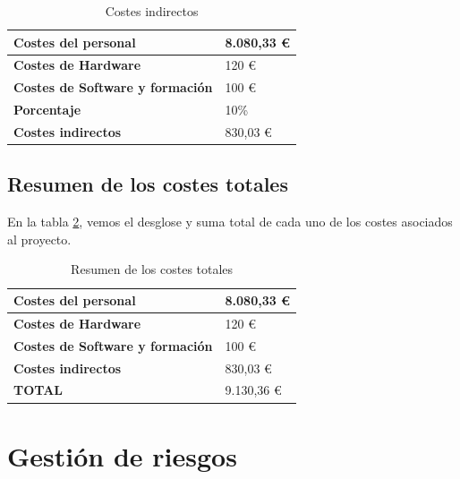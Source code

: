 \begin{table}[htpb]
\centering
\begin{tabular}{|l|l|}
\hline
\textbf{Costes del personal}            & 8.080,33 \euro \\ \hline
\textbf{Costes de Hardware}             & 120 \euro      \\ \hline
\textbf{Costes de Software y formación} & 100 \euro      \\ \hline
\textbf{Porcentaje}                     & 10\%       \\ \hline
\textbf{Costes indirectos}              & 830,03 \euro   \\ \hline
\end{tabular}
\caption{Costes indirectos}
\label{fig:coste_indirecto}
\end{table}


\subsection{Resumen de los costes totales}
En la tabla \ref{fig:coste_total}, vemos el desglose y suma total de cada uno de los costes asociados al proyecto.


\begin{table}[htpb]
\centering
\begin{tabular}{|l|l|}
\hline
\textbf{Costes del personal}            & 8.080,33 \euro \\ \hline
\textbf{Costes de Hardware}             & 120 \euro      \\ \hline
\textbf{Costes de Software y formación} & 100 \euro      \\ \hline
\textbf{Costes indirectos}              & 830,03 \euro   \\ \hline
\textbf{TOTAL}                          & 9.130,36 \euro \\ \hline
\end{tabular}
\caption{Resumen de los costes totales}
\label{fig:coste_total}
\end{table}






\section{Gestión de riesgos}

